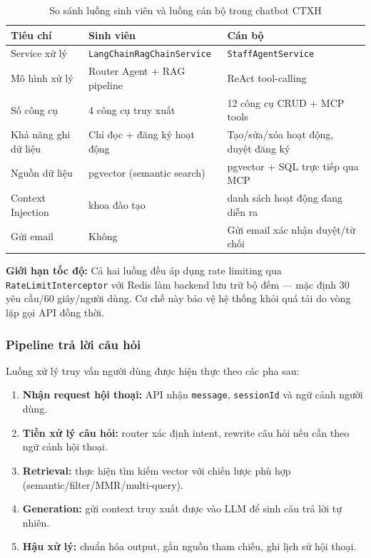 \begin{table}[H]
\centering
\renewcommand{\arraystretch}{1.3}
\begin{tabular}{|p{3.5cm}|p{5.5cm}|p{5.5cm}|}
\hline
\textbf{Tiêu chí} & \textbf{Sinh viên} & \textbf{Cán bộ} \\
\hline
Service xử lý & \texttt{LangChainRagChainService} & \texttt{StaffAgentService} \\
\hline
Mô hình xử lý & Router Agent + RAG pipeline & ReAct tool-calling \\
\hline
Số công cụ & 4 công cụ truy xuất & 12 công cụ CRUD + MCP tools \\
\hline
Khả năng ghi dữ liệu & Chỉ đọc + đăng ký hoạt động & Tạo/sửa/xóa hoạt động, duyệt đăng ký \\
\hline
Nguồn dữ liệu & pgvector (semantic search) & pgvector + SQL trực tiếp qua MCP \\
\hline
Context Injection & khoa đào tạo & danh sách hoạt động đang diễn ra \\
\hline
Gửi email & Không & Gửi email xác nhận duyệt/từ chối \\
\hline
\end{tabular}
\caption{So sánh luồng sinh viên và luồng cán bộ trong chatbot CTXH}
\end{table}

\textbf{Giới hạn tốc độ:} Cả hai luồng đều áp dụng rate limiting qua \texttt{RateLimitInterceptor} với Redis làm backend lưu trữ bộ đếm — mặc định 30 yêu cầu/60 giây/người dùng. Cơ chế này bảo vệ hệ thống khỏi quá tải do vòng lặp gọi API đồng thời.

\subsubsection{Pipeline trả lời câu hỏi}
Luồng xử lý truy vấn người dùng được hiện thực theo các pha sau:
\begin{enumerate}
	\item \textbf{Nhận request hội thoại:} API nhận \texttt{message}, \texttt{sessionId} và ngữ cảnh người dùng.
	\item \textbf{Tiền xử lý câu hỏi:} router xác định intent, rewrite câu hỏi nếu cần theo ngữ cảnh hội thoại.
	\item \textbf{Retrieval:} thực hiện tìm kiếm vector với chiến lược phù hợp (semantic/filter/MMR/multi-query).
	\item \textbf{Generation:} gửi context truy xuất được vào LLM để sinh câu trả lời tự nhiên.
	\item \textbf{Hậu xử lý:} chuẩn hóa output, gắn nguồn tham chiếu, ghi lịch sử hội thoại.
\end{enumerate}

